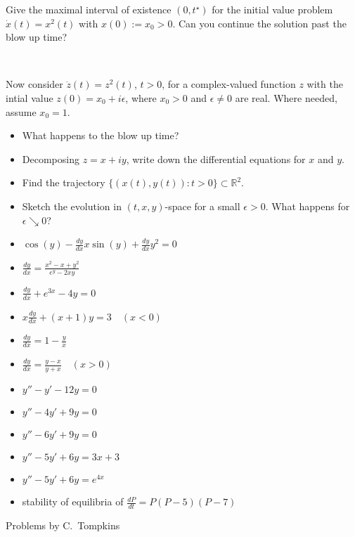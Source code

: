 \documentclass[onepage, 12pt]{beamer}
\begin{document}
\begin{frame}{}{}
    Give the maximal interval of existence $(0, t^\star)$
    for the initial value problem
    $\dot{x}(t) = x^2(t)$
    with
    $x(0) := x_0 > 0$.
    Can you continue the solution past the blow up time?

    {\ }
    
    \pause
    
    Now consider 
    $\dot{z}(t) = z^2(t)$, $t > 0$,
    for a complex-valued function $z$
    with the intial value
    $z(0) = x_0 + i \epsilon$,
    where $x_0 > 0$ and $\epsilon \neq 0$ are real.
    Where needed, assume $x_0 = 1$.

    \begin{itemize}
    \item 
        What happens to the blow up time?
    \item
        Decomposing $z = x + i y$,
        write down the differential equations for $x$ and $y$.
    \item
        Find the trajectory $\{ (x(t), y(t)) : t > 0 \} \subset \mathbb{R}^2$.
    \item
        Sketch the evolution in $(t, x, y)$-space 
        for a small $\epsilon > 0$.
        What happens for $\epsilon \searrow 0$?
    \end{itemize}
\end{frame}



\begin{frame}{}{}
    \begin{itemize}
    \item 
        $\cos(y) - \frac{dy}{dx}x \sin(y) + \frac{dy}{dx}y^2 = 0$
    \item
        $\frac{dy}{dx} = \frac{x^2-x+y^2}{e^y-2xy}$
    \item
        $\frac{dy}{dx} + e^{3x} - 4y = 0$
    \item
        $x \frac{dy}{dx} + (x+1)y = 3 \quad (x<0)$
    \item
        $\frac{dy}{dx} = 1 - \frac{y}{x}$
    \item
        $\frac{dy}{dx} = \frac{y-x}{y+x} \quad (x>0)$
    \item
        $y''-y' -12y = 0$
    \item
        $y'' - 4y' + 9y = 0$
    \item
        $y''-6y'+9y = 0$
    \item
        $y''-5y' +6y = 3x + 3$
    \item 
        $y''-5y' +6y = e^{4x}$
    \item
        stability of equilibria of $\frac{dP}{dt} = P(P-5)(P-7)$
    \end{itemize}
    
    \hfill
    {\footnotesize Problems by C.~Tompkins}
\end{frame}
\end{document}
